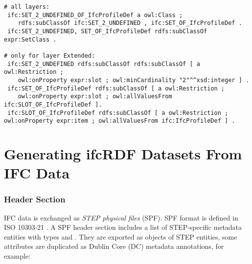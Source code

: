 

\begin{lstlisting}
# all layers:
 ifc:SET_2_UNDEFINED_OF_IfcProfileDef a owl:Class ;
    rdfs:subClassOf ifc:SET_2_UNDEFINED , ifc:SET_OF_IfcProfileDef .
 ifc:SET_2_UNDEFINED, SET_OF_IfcProfileDef rdfs:subClassOf expr:SetClass .

# only for layer Extended:
 ifc:SET_2_UNDEFINED rdfs:subClassOf rdfs:subClassOf [ a owl:Restriction ;
    owl:onProperty expr:slot ; owl:minCardinality "2"^^xsd:integer ] .
 ifc:SET_OF_IfcProfileDef rdfs:subClassOf [ a owl:Restriction ;
    owl:onProperty expr:slot ; owl:allValuesFrom ifc:SLOT_OF_IfcProfileDef ].
 ifc:SLOT_OF_IfcProfileDef rdfs:subClassOf [ a owl:Restriction ; owl:onProperty expr:item ; owl:allValuesFrom ifc:IfcProfileDef ] .
\end{lstlisting}



\section{Generating ifcRDF Datasets From IFC Data}
\label{sec:ifcRDF}

\subsubsection{Header Section} IFC data is exchanged as \emph{STEP physical files} (SPF). SPF format is defined in ISO 10303-21 \cite{ISO10303-21}. A SPF header section includes a list of STEP-specific metadata entities with types   and . %
They are exported as objects of STEP entities, some attributes are duplicated as Dublin Core (DC) metadata annotations, for example:

